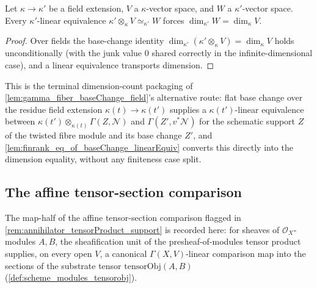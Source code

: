 \begin{lemma}\leanok
  \label{lem:finrank_eq_of_baseChange_linearEquiv}
  Let \(\kappa \to \kappa'\) be a field extension, \(V\) a \(\kappa\)-vector
  space, and \(W\) a \(\kappa'\)-vector space. Every \(\kappa'\)-linear
  equivalence \(\kappa' \otimes_\kappa V \simeq_{\kappa'} W\) forces
  \(\dim_{\kappa'} W = \dim_\kappa V\).
\end{lemma}
\begin{proof}\leanok
  Over fields the base-change identity
  \(\dim_{\kappa'}(\kappa' \otimes_\kappa V) = \dim_\kappa V\) holds
  unconditionally (with the junk value \(0\) shared correctly in the
  infinite-dimensional case), and a linear equivalence transports dimension.
\end{proof}

\begin{remark}
  \label{rem:finrank_baseChange_linearEquiv_role}
  This is the terminal dimension-count packaging of
  \cref{lem:gamma_fiber_baseChange_field}'s alternative route: flat base
  change over the residue field extension \(\kappa(t) \to \kappa(t')\)
  supplies a \(\kappa(t')\)-linear equivalence between
  \(\kappa(t') \otimes_{\kappa(t)} \Gamma(Z, \mathcal N)\) and
  \(\Gamma(Z', v^*\mathcal N)\) for the schematic support \(Z\) of the
  twisted fibre module and its base change \(Z'\), and
  \cref{lem:finrank_eq_of_baseChange_linearEquiv} converts this directly into
  the dimension equality, without any finiteness case split.
\end{remark}

\subsection{The affine tensor-section comparison}
\label{subsec:tensor_section_formula}

The map-half of the affine tensor-section comparison flagged in
\cref{rem:annihilator_tensorProduct_support} is recorded here: for sheaves
of \(\mathcal O_X\)-modules \(A, B\), the sheafification unit of the
presheaf-of-modules tensor product supplies, on every open \(V\), a
canonical \(\Gamma(X,V)\)-linear comparison map into the sections of the
substrate tensor \(\mathrm{tensorObj}(A,B)\) (\cref{def:scheme_modules_tensorobj}).

